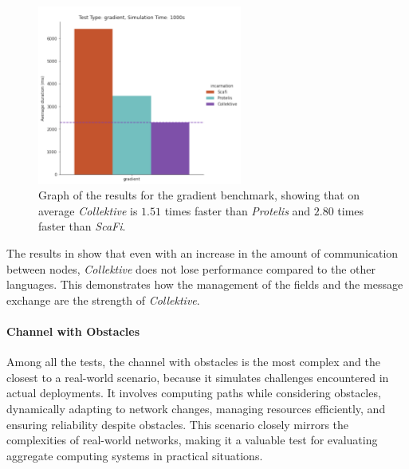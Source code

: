 \begin{figure}[ht!]
    \centering
    \includegraphics[width=0.6\textwidth]{figures/gradient-results}
    \caption{Graph of the results for the gradient benchmark, showing that on average \emph{Collektive} is $1.51$ times faster
    than \emph{Protelis} and $2.80$ times faster than \emph{ScaFi}.}
    \label{fig:gradient-resutls}
\end{figure}

The results in  show that even with an increase in the amount of communication between nodes,
\emph{Collektive} does not lose performance compared to the other languages.
This demonstrates how the management of the fields and the message exchange are the strength of \emph{Collektive}.

\paragraph{Channel with Obstacles}
Among all the tests, the channel with obstacles is the most complex and the closest to a real-world scenario,
because it simulates challenges encountered in actual deployments.
It involves computing paths while considering obstacles, dynamically adapting to network changes, managing resources
efficiently, and ensuring reliability despite obstacles.
This scenario closely mirrors the complexities of real-world networks, making it a valuable test for evaluating aggregate
computing systems in practical situations.

